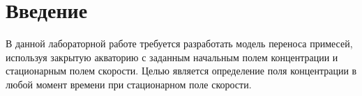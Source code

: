 \pagebreak

\section{Введение}
	В данной лабораторной работе требуется разработать модель переноса примесей, используя закрытую акваторию с заданным начальным полем концентрации и стационарным полем скорости. Целью является определение поля концентрации в любой момент времени при стационарном поле скорости.


\pagebreak